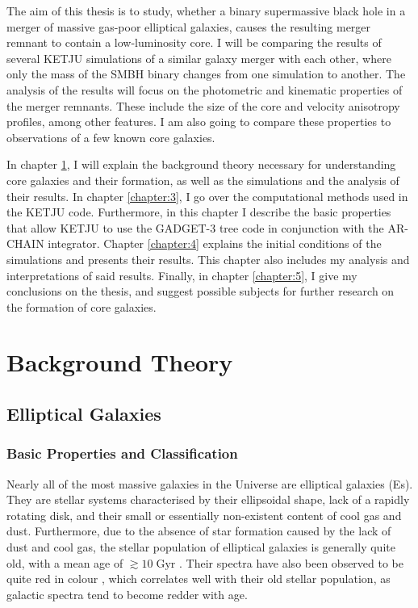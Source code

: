 \documentclass[english, twoside]{HYgradu}
\begin{document}
The aim of this thesis is to study, whether a binary supermassive black hole in a merger of massive gas-poor elliptical galaxies, causes the resulting merger remnant to contain a low-luminosity core. I will be comparing the results of several KETJU simulations of a similar galaxy merger with each other, where only the mass of the SMBH binary changes from one simulation to another. The analysis of the results will focus on the photometric and kinematic properties of the merger remnants. These include the size of the core and velocity anisotropy profiles, among other features. I am also going to compare these properties to observations of a few known core galaxies. 

In chapter \ref{chapter:2}, I will explain the background theory necessary for understanding core galaxies and their formation, as well as the simulations and the analysis of their results. In chapter \ref{chapter:3}, I go over the computational methods used in the KETJU code. Furthermore, in this chapter I describe the basic properties that allow KETJU to use the GADGET-3 tree code in conjunction with the AR-CHAIN integrator. Chapter \ref{chapter:4} explains the initial conditions of the simulations and presents their results. This chapter also includes my analysis and interpretations of said results. Finally, in chapter \ref{chapter:5}, I give my conclusions on the thesis, and suggest possible subjects for further research on the formation of core galaxies.

\chapter{Background Theory} \label{chapter:2}

\section{Elliptical Galaxies} \label{section:elliptical}

\subsection{Basic Properties and Classification}

Nearly all of the most massive galaxies in the Universe are elliptical galaxies (Es). They are stellar systems characterised by their ellipsoidal shape, lack of a rapidly rotating disk, and their small or essentially non-existent content of cool gas and dust. Furthermore, due to the absence of star formation caused by the lack of dust and cool gas, the stellar population of elliptical galaxies is generally quite old, with a mean age of $\gtrsim{10} \; \mathrm{Gyr}$ \citep{GalaxyFormationAndEvo2010}. Their spectra have also been observed to be quite red in colour \citep{Cappellari2016}, which correlates well with their old stellar population, as galactic spectra tend to become redder with age.
\end{document}
